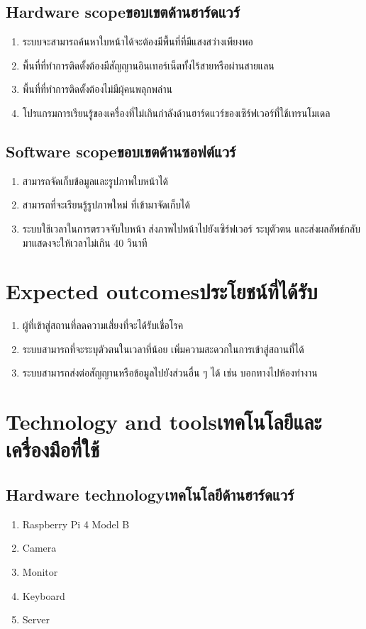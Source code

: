 \subsection{\ifenglish Hardware scope\else ขอบเขตด้านฮาร์ดแวร์\fi}
\begin{enumerate}
    \item ระบบจะสามารถค้นหาใบหน้าได้จะต้องมีพื้นที่ที่มีแสงสว่างเพียงพอ
    \item พื้นที่ที่ทำการติดตั้งต้องมีสัญญานอินเทอร์เน็ตทั้งไร้สายหรือผ่านสายแลน
    \item พื้นที่ที่ทำการติดตั้งต้องไม่มีผุ้คนพลุกพล่าน
    \item โปรแกรมการเรียนรู้ของเครื่องที่ไม่เกินกําลังด้านฮาร์ดแวร์ของเซิร์ฟเวอร์ที่ใช้เทรนโมเดล
\end{enumerate}

\subsection{\ifenglish Software scope\else ขอบเขตด้านซอฟต์แวร์\fi}
\begin{enumerate}
    \item สามารถจัดเก็บข้อมูลและรูปภาพใบหน้าได้
    \item สามารถที่จะเรียนรู้รูปภาพใหม่ ที่เข้ามาจัดเก็บได้
    \item ระบบใช้เวลาในการตรวจจับใบหน้า ส่งภาพไปหน้าไปยังเซิร์ฟเวอร์ ระบุตัวตน และส่งผลลัพธ์กลับมาแสดงจะให้เวลาไม่เกิน 40 วินาที
\end{enumerate}

\section{\ifenglish Expected outcomes\else ประโยชน์ที่ได้รับ\fi}
\begin{enumerate}
    \item ผู้ที่เข้าสู่สถานที่ลดความเสี่ยงที่จะได้รับเชื่อโรค
    \item ระบบสามารถที่จะระบุตัวตนในเวลาที่น้อย เพิ่มความสะดวกในการเข้าสู่สถานที่ได้
    \item ระบบสามารถส่งต่อสัญญานหรือข้อมูลไปยังส่วนอื่น ๆ ได้ เช่น บอกทางไปห้องทำงาน
\end{enumerate}

\section{\ifenglish Technology and tools\else เทคโนโลยีและเครื่องมือที่ใช้\fi}
\subsection{\ifenglish Hardware technology\else เทคโนโลยีด้านฮาร์ดแวร์\fi}
\begin{enumerate}
    \item Raspberry Pi 4 Model B
    \item Camera
    \item Monitor
    \item Keyboard
    \item Server
\end{enumerate}

